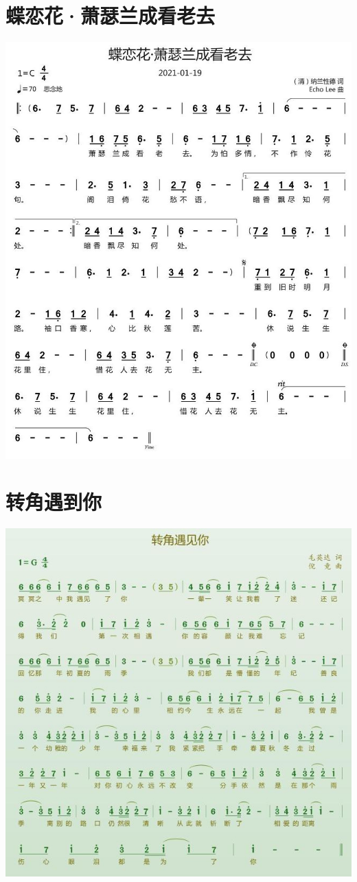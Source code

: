 \documentclass[cn,pad,twocol]{elegantbook}
\begin{document}
\section{蝶恋花·萧瑟兰成看老去} \includegraphics[width=\textwidth]{rpi400/20210206蝶恋花·萧瑟兰成看老去.jpg}
\section{转角遇到你} \includegraphics[width=\textwidth]{rpi400/20210206转角遇到你.jpg}
\end{document}
